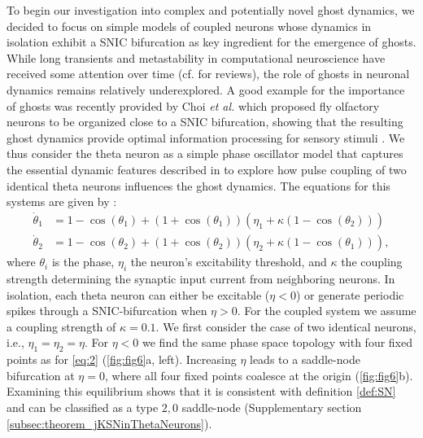 \documentclass{article}
\theoremstyle{definition}
\begin{document}
\begin{refsection}
To begin our investigation into complex and potentially novel ghost dynamics, we decided to focus on simple models of coupled neurons whose dynamics in isolation exhibit a SNIC bifurcation as key ingredient for the emergence of ghosts. While long transients and metastability in computational neuroscience have received some attention over time (cf. \cite{Hancock2024,Rossi_2025} for reviews), the role of ghosts in neuronal dynamics remains relatively underexplored. A good example for the importance of ghosts was recently provided by Choi \textit{et al.} which proposed fly olfactory neurons to be organized close to a SNIC bifurcation, showing that the resulting ghost dynamics provide optimal information processing for sensory stimuli \cite{Choi_2024}. We thus consider the theta neuron \cite{Ermentrout1986} as a simple phase oscillator model that captures the essential dynamic features described in \cite{Choi_2024} to explore how pulse coupling of two identical theta neurons influences the ghost dynamics. The equations for this systems are given by \cite{Augustsson2024}: 
\begin{align}
    \dot{\theta}_1 &= 1 - \cos(\theta_1) + \left(1 + \cos(\theta_1)\right) \left(\eta_1 + \kappa \left(1 - \cos(\theta_2)\right)\right) \label{eq:augustson}\\
    \dot{\theta}_2 &= 1 - \cos(\theta_2) + \left(1 + \cos(\theta_2)\right) \left(\eta_2 + \kappa \left(1 - \cos(\theta_1)\right)\right) \nonumber,
\end{align}
where $\theta_i$ is the phase, $\eta_i$ the neuron's excitability threshold, and $\kappa$ the coupling strength determining the synaptic input current from neighboring neurons. In isolation, each theta neuron can either be excitable ($\eta<0$) or generate periodic spikes through a SNIC-bifurcation when $\eta>0$. For the coupled system we assume a coupling strength of $\kappa = 0.1$. We first consider the case of two identical neurons, i.e., $\eta_1=\eta_2=\eta$. For $\eta<0$ we find the same phase space topology with four fixed points as for \autoref{eq:2} (\autoref{fig:fig6}a, left). Increasing $\eta$ leads to a saddle-node bifurcation at $\eta=0$, where all four fixed points coalesce at the origin (\autoref{fig:fig6}b).  Examining this equilibrium shows that it is consistent with definition \ref{def:SN} and can be classified as a type $2,0$ saddle-node (Supplementary section \ref{subsec:theorem_jKSNinThetaNeurons}).

\end{refsection}
\end{document}
